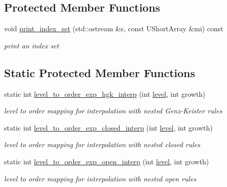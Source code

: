 \subsection*{Protected Member Functions}
\begin{DoxyCompactItemize}
\item 
void \hyperlink{classPecos_1_1SparseGridDriver_a51cb2fb40328820ad3062c93d4155e68}{print\+\_\+index\+\_\+set} (std\+::ostream \&s, const U\+Short\+Array \&mi) const \label{classPecos_1_1SparseGridDriver_a51cb2fb40328820ad3062c93d4155e68}

\begin{DoxyCompactList}\small\item\em print an index set \end{DoxyCompactList}\end{DoxyCompactItemize}
\subsection*{Static Protected Member Functions}
\begin{DoxyCompactItemize}
\item 
static int \hyperlink{classPecos_1_1SparseGridDriver_a2e0cf262f3c41d1a4c6a6caf7a823baa}{level\+\_\+to\+\_\+order\+\_\+exp\+\_\+hgk\+\_\+interp} (int \hyperlink{classPecos_1_1SparseGridDriver_ab3075bdfb04432d86fb8376e9414ed4a}{level}, int growth)\label{classPecos_1_1SparseGridDriver_a2e0cf262f3c41d1a4c6a6caf7a823baa}

\begin{DoxyCompactList}\small\item\em level to order mapping for interpolation with nested Genz-\/\+Keister rules \end{DoxyCompactList}\item 
static int \hyperlink{classPecos_1_1SparseGridDriver_ac2013fc887a6c47d5be7c970cca0ae13}{level\+\_\+to\+\_\+order\+\_\+exp\+\_\+closed\+\_\+interp} (int \hyperlink{classPecos_1_1SparseGridDriver_ab3075bdfb04432d86fb8376e9414ed4a}{level}, int growth)\label{classPecos_1_1SparseGridDriver_ac2013fc887a6c47d5be7c970cca0ae13}

\begin{DoxyCompactList}\small\item\em level to order mapping for interpolation with nested closed rules \end{DoxyCompactList}\item 
static int \hyperlink{classPecos_1_1SparseGridDriver_a237432210af42cb6820cc634976328e3}{level\+\_\+to\+\_\+order\+\_\+exp\+\_\+open\+\_\+interp} (int \hyperlink{classPecos_1_1SparseGridDriver_ab3075bdfb04432d86fb8376e9414ed4a}{level}, int growth)\label{classPecos_1_1SparseGridDriver_a237432210af42cb6820cc634976328e3}

\begin{DoxyCompactList}\small\item\em level to order mapping for interpolation with nested open rules \end{DoxyCompactList}\end{DoxyCompactItemize}
